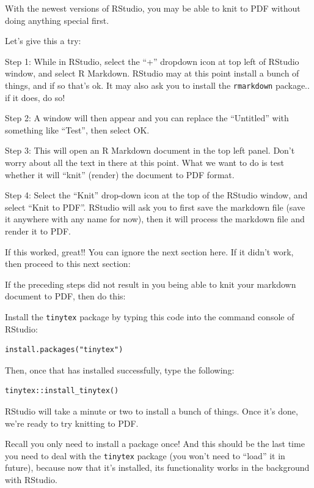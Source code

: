 \documentclass[
]{book}
\begin{document}
With the newest versions of RStudio, you may be able to knit to PDF without doing anything special first.

Let's give this a try:

Step 1: While in RStudio, select the ``+'' dropdown icon at top left of RStudio window, and select R Markdown. RStudio may at this point install a bunch of things, and if so that's ok. It may also ask you to install the \texttt{rmarkdown} package.. if it does, do so!

Step 2: A window will then appear and you can replace the ``Untitled'' with something like ``Test'', then select OK.

Step 3: This will open an R Markdown document in the top left panel. Don't worry about all the text in there at this point. What we want to do is test whether it will ``knit'' (render) the document to PDF format.

Step 4: Select the ``Knit'' drop-down icon at the top of the RStudio window, and select ``Knit to PDF''. RStudio will ask you to first save the markdown file (save it anywhere with any name for now), then it will process the markdown file and render it to PDF.

If this worked, great!! You can ignore the next section here. If it didn't work, then proceed to this next section:

If the preceding steps did not result in you being able to knit your markdown document to PDF, then do this:

Install the \texttt{tinytex} package by typing this code into the command console of RStudio:

\begin{verbatim}
install.packages("tinytex")
\end{verbatim}

Then, once that has installed successfully, type the following:

\begin{verbatim}
tinytex::install_tinytex()
\end{verbatim}

RStudio will take a minute or two to install a bunch of things. Once it's done, we're ready to try knitting to PDF.

Recall you only need to install a package once! And this should be the last time you need to deal with the \texttt{tinytex} package (you won't need to ``load'' it in future), because now that it's installed, its functionality works in the background with RStudio.
\end{document}
